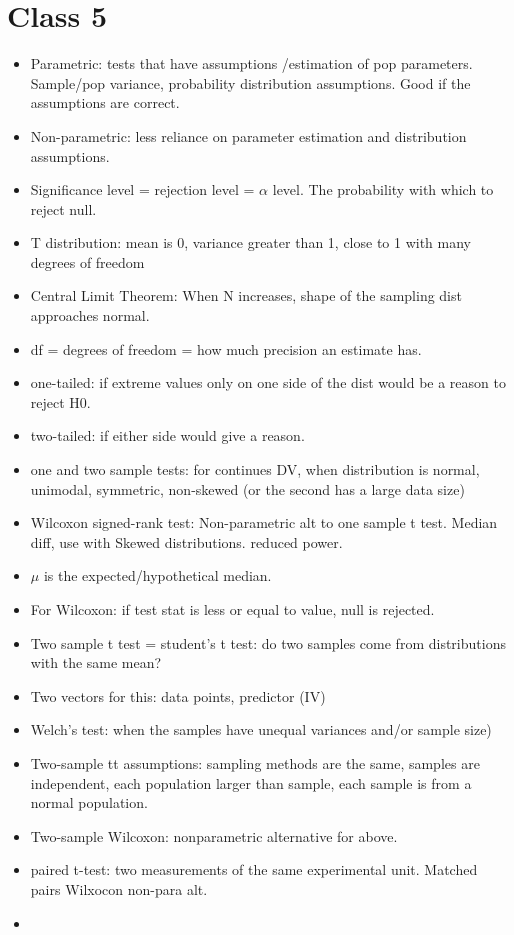 \documentclass[11pt]{article}
\newenvironment{itemise}{
\begin{itemize}
  \setlength{\itemsep}{1pt}
  \setlength{\parskip}{0pt}
  \setlength{\parsep}{0pt}
}{\end{itemize}}
\begin{document}
\section*{Class 5}
\begin{itemise}
\item Parametric: tests that have assumptions /estimation of pop parameters. Sample/pop variance, probability distribution assumptions. Good if the assumptions are correct.
\item Non-parametric: less reliance on parameter estimation and distribution assumptions. 
\item Significance level = rejection level = $\alpha$ level. The probability with which to reject null. 
\item T distribution: mean is 0, variance greater than 1, close to 1 with many degrees of freedom
\item Central Limit Theorem: When N increases, shape of the sampling dist approaches normal. %
\item df = degrees of freedom = how much precision an estimate has. 
\item one-tailed: if extreme values only on one side of the dist would be a reason to reject H0.
\item two-tailed: if either side would give a reason. 
\item  one and two sample tests: for continues DV, when distribution is normal, unimodal, symmetric, non-skewed (or the second has a large data size)
\item Wilcoxon signed-rank test: Non-parametric alt to one sample t test. Median diff, use with Skewed distributions. reduced power.
\item $\mu$ is the expected/hypothetical median.
\item For Wilcoxon: if test stat is less or equal to value, null is rejected. 
\item Two sample t test = student's t test: do two samples come from distributions with the same mean?
\item Two vectors for this: data points, predictor (IV)
\item Welch's test: when the samples have unequal variances and/or sample size)
\item Two-sample tt assumptions: sampling methods are the same, samples are independent, each population larger than sample, each sample is from a normal population.
\item Two-sample Wilcoxon: nonparametric alternative for above.
\item paired t-test: two measurements of the same experimental unit. Matched pairs Wilxocon non-para alt.
\item 
\end{itemise}
\end{document}
